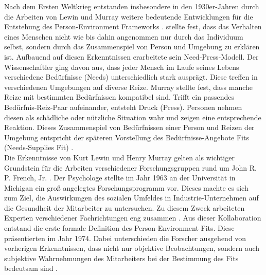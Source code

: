 Nach dem Ersten Weltkrieg entstanden insbesondere in den 1930er-Jahren durch die Arbeiten von Lewin und Murray weitere bedeutende Entwicklungen für die Entstehung des Person-Environment Frameworks \cite[S. 1]{edwards:1990}. \textcite[S. 11f.]{lewin:1936} stellte fest, dass das Verhalten eines Menschen nicht wie bis dahin angenommen nur durch das Individuum selbst, sondern durch das Zusammenspiel von Person und Umgebung zu erklären ist. Aufbauend auf diesen Erkenntnissen erarbeitete \textcite[S. 38ff.]{murray:1938} sein Need-Press-Modell. Der Wissenschaftler ging davon aus, dass jeder Mensch im Laufe seines Lebens verschiedene Bedürfnisse (Needs) unterschiedlich stark ausprägt. Diese treffen in verschiedenen Umgebungen auf diverse Reize. Murray stellte fest, dass manche Reize mit bestimmten Bedürfnissen kompatibel sind. Trifft ein passendes Bedürfnis-Reiz-Paar aufeinander, entsteht Druck (Press). Personen nehmen diesen als schädliche oder nützliche Situation wahr und zeigen eine entsprechende Reaktion. Dieses Zusammenspiel von Bedürfnissen einer Person und Reizen der Umgebung entspricht der späteren Vorstellung des Bedürfnisse-Angebote Fits (Needs-Supplies Fit) \cite[S. 8]{edwards:2008}. \\
Die Erkenntnisse von Kurt Lewin und Henry Murray gelten als wichtiger Grundstein für die Arbeiten verschiedener Forschungsgruppen rund um John R. P. French, Jr. \cite[S. 5]{caplan:1993}. Der Psychologe stellte im Jahr 1963 an der Universität in Michigan ein groß angelegtes Forschungsprogramm vor. Dieses machte es sich zum Ziel, die Auswirkungen des sozialen Umfeldes in Industrie-Unternehmen auf die Gesundheit der Mitarbeiter zu untersuchen. Zu diesem Zweck arbeiteten Experten verschiedener Fachrichtungen eng zusammen \cite[S. 1ff.]{french:1963}. Aus dieser Kollaboration entstand die erste formale Definition des Person-Environment Fits. Diese präsentierten \textcite{copingAndAdaption:1974} im Jahr 1974. Dabei unterschieden die Forscher ausgehend von vorherigen Erkenntnissen, dass nicht nur objektive Beobachtungen, sondern auch subjektive Wahrnehmungen des Mitarbeiters bei der Bestimmung des Fits bedeutsam sind \cite[S. 4f.]{caplan:1993}\cite[S. 1ff.]{french:1966}. \\

